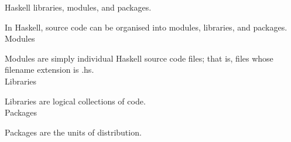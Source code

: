 
\begin{frame}[t, fragile]{Haskell libraries, modules, and packages.}

In Haskell, source code can be organised into modules, libraries, and packages. \\

\textbullet{} Modules

Modules are simply individual Haskell source code files; that is, files whose
filename extension is .hs. \\

\textbullet{} Libraries

Libraries are logical collections of code. \\

\textbullet{} Packages

Packages are the units of distribution. \\

\end{frame}
